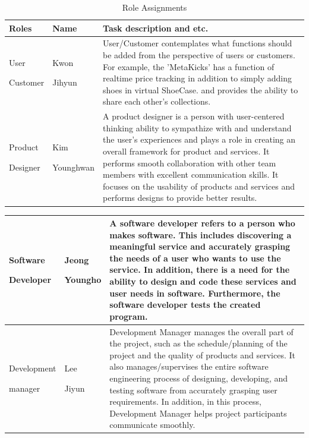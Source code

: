\documentclass[conference]{IEEEtran}
\begin{document}
\begin{table}[h]
\caption{Role Assignments}
\def\arraystretch{1.24} \small
    \begin{tabular}{|p{1.8cm}|p{1.4cm}|p{4.4cm}|}
        \hline
        Roles & Name & Task description and etc. \\ \hline
         User \par Customer & Kwon \par Jihyun & User/Customer contemplates what functions should be added from the perspective of users or customers. For example, the 'MetaKicks' has a function of realtime price tracking in addition to simply adding shoes in virtual ShoeCase. and provides the ability to share each other's collections.\\ \hline
         
          Product \par Designer& Kim \par Younghwan  & A product designer is a person with user-centered thinking ability to sympathize with and understand the user's experiences and plays a role in creating an overall framework for product and services. It performs smooth collaboration with other team members with  excellent communication skills. It focuses on the usability of products and services and performs designs to provide better results.\\ \hline
 
	\end{tabular}
\end{table}

\begin{table}
\def\arraystretch{1.24} \small
    \begin{tabular}{|p{1.8cm}|p{1.4cm}|p{4.4cm}|}
        \hline
              
        Software \par Developer & Jeong \par Youngho  & A software developer refers to a person who makes software. This includes discovering a meaningful service and accurately grasping the needs of a user who wants to use the service. In addition, there is a need for the ability to design and code these services and user needs in software. Furthermore, the software developer tests the created program. \\ \hline
        
        Development \par manager & Lee \par Jiyun & Development Manager manages the overall part of the project, such as the schedule/planning of the project and the quality of products and services. It also manages/supervises the entire software engineering process of designing, developing, and testing software from accurately grasping user  requirements. In addition, in this process, Development Manager helps project participants communicate smoothly. \\ \hline
    \end{tabular}
\end{table}
\end{document}
